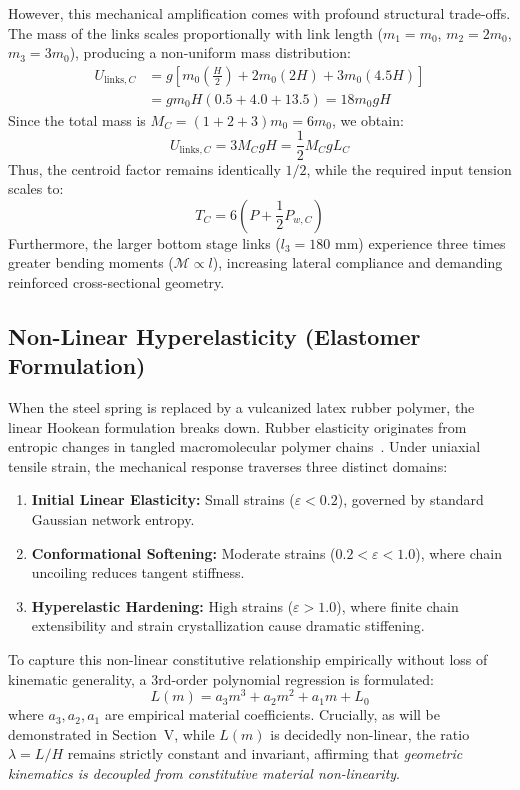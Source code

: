 \documentclass[10pt,twocolumn]{article}
\begin{document}
However, this mechanical amplification comes with profound structural trade-offs. The mass of the links scales proportionally with link length ($m_1 = m_0$, $m_2 = 2 m_0$, $m_3 = 3 m_0$), producing a non-uniform mass distribution:
\begin{align}
    U_{\text{links}, C} &= g \left[ m_0 \left(\frac{H}{2}\right) + 2 m_0 (2 H) + 3 m_0 (4.5 H) \right] \nonumber \\
    &= g m_0 H (0.5 + 4.0 + 13.5) = 18 m_0 g H
\end{align}
Since the total mass is $M_C = (1 + 2 + 3) m_0 = 6 m_0$, we obtain:
\begin{equation}
    U_{\text{links}, C} = 3 M_C g H = \frac{1}{2} M_C g L_C
\end{equation}
Thus, the centroid factor remains identically $1/2$, while the required input tension scales to:
\begin{equation}
    T_C = 6 \left( P + \frac{1}{2} P_{w, C} \right)
\end{equation}
Furthermore, the larger bottom stage links ($l_3 = 180\text{ mm}$) experience three times greater bending moments ($\mathcal{M} \propto l$), increasing lateral compliance and demanding reinforced cross-sectional geometry.

\subsection{Non-Linear Hyperelasticity (Elastomer Formulation)}

When the steel spring is replaced by a vulcanized latex rubber polymer, the linear Hookean formulation breaks down. Rubber elasticity originates from entropic changes in tangled macromolecular polymer chains~\cite{ogden1997non}. Under uniaxial tensile strain, the mechanical response traverses three distinct domains:
\begin{enumerate}
    \item \textbf{Initial Linear Elasticity:} Small strains ($\varepsilon < 0.2$), governed by standard Gaussian network entropy.
    \item \textbf{Conformational Softening:} Moderate strains ($0.2 < \varepsilon < 1.0$), where chain uncoiling reduces tangent stiffness.
    \item \textbf{Hyperelastic Hardening:} High strains ($\varepsilon > 1.0$), where finite chain extensibility and strain crystallization cause dramatic stiffening.
\end{enumerate}

To capture this non-linear constitutive relationship empirically without loss of kinematic generality, a 3rd-order polynomial regression is formulated:
\begin{equation}
    L(m) = a_3 m^3 + a_2 m^2 + a_1 m + L_0
    \label{eq:cubic_fit}
\end{equation}
where $a_3, a_2, a_1$ are empirical material coefficients. Crucially, as will be demonstrated in Section~V, while $L(m)$ is decidedly non-linear, the ratio $\lambda = L/H$ remains strictly constant and invariant, affirming that \textit{geometric kinematics is decoupled from constitutive material non-linearity}.
\end{document}
